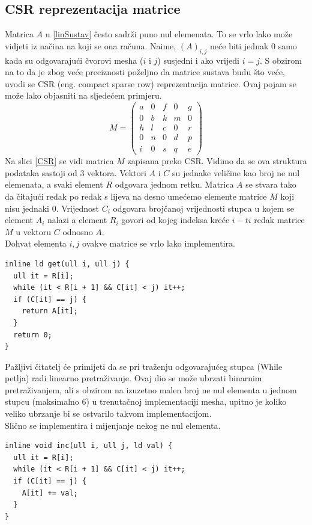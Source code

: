 \documentclass[zavrsnirad]{../fer}
\begin{document}
\subsection{CSR reprezentacija matrice}
Matrica $A$ u \ref{linSustav} 
često sadrži puno nul elemenata. To se vrlo lako može 
vidjeti iz načina na koji se ona računa. Naime, $(A)_{i,j}$ 
neće biti jednak $0$ samo kada su odgovarajući čvorovi 
mesha ($i$ i $j$) susjedni i ako vrijedi $i = j$.
S obzirom na to da je 
zbog veće preciznosti poželjno da
matrice sustava budu što veće,
uvodi se CSR (eng. compact sparse row)
reprezentacija matrice. Ovaj pojam se može lako objasniti na
sljedećem primjeru.
$$M = \begin{pmatrix}
  a & 0 & f & 0 & g\\ 
  0 & b & k & m & 0\\ 
  h & l & c & 0 & r\\ 
  0 & n & 0 & d & p\\ 
  i & 0 & s & q & e
\end{pmatrix}$$
Na slici \ref{CSR} 
se vidi matrica $M$ zapisana preko CSR. Vidimo da se
ova struktura podataka sastoji od 3 vektora. 
Vektori $A$ i $C$ su jednake veličine kao broj ne nul 
elemenata, a svaki element $R$ odgovara jednom retku.
Matrica $A$ se stvara tako da čitajući redak po redak
s lijeva na desno umećemo elemente matrice $M$ koji 
nisu jednaki $0$. Vrijednost $C_i$ odgovara brojčanoj
vrijednosti stupca u kojem se element $A_i$ nalazi 
a element $R_i$ govori od kojeg indeksa kreće $i-ti$
redak matrice $M$ u vektoru $C$ odnosno $A$. 
\\ 
\bigskip
Dohvat elementa $i,j$ ovakve matrice se vrlo lako implementira.
\begin{verbatim}
inline ld get(ull i, ull j) {
  ull it = R[i];
  while (it < R[i + 1] && C[it] < j) it++;
  if (C[it] == j) {
    return A[it];
  }
  return 0;
}
\end{verbatim}
Pažljivi čitatelj će primijeti da se pri traženju odgovarajućeg
stupca (While petlja) radi linearno pretraživanje. Ovaj dio 
se može ubrzati binarnim pretraživanjem, ali s obzirom na 
izuzetno malen broj ne nul elementa u jednom stupcu (maksimalno $6$)
u trenutačnoj implementaciji mesha, upitno je koliko veliko ubrzanje 
bi se ostvarilo takvom implementacijom.
\\ 
\bigskip
Slično se implementira i mijenjanje nekog ne nul elementa.
\begin{verbatim}
inline void inc(ull i, ull j, ld val) {
  ull it = R[i];
  while (it < R[i + 1] && C[it] < j) it++;
  if (C[it] == j) {
    A[it] += val;
  }
}
\end{verbatim}
\end{document}
